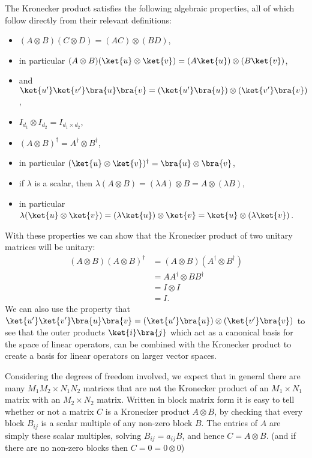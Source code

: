 The Kronecker product satisfies the following algebraic properties, all of which follow directly from their relevant definitions:
\begin{itemize}
	\item $(A\otimes B)(C \otimes D) = (AC) \otimes (BD)$,
	\item in particular $(A\otimes B)(\ket{u} \otimes \ket{v}) = (A\ket{u})\otimes (B\ket{v})$,
	\item and $\ket{u'}\ket{v'}\bra{u}\bra{v} = (\ket{u'}\bra{u})\otimes(\ket{v'}\bra{v})$,
	\item $I_{d_1} \otimes I_{d_2} = I_{d_1\times d_2}$,
	\item $(A\otimes B)^\dagger = A^\dagger \otimes B^\dagger$,
	\item in particular $(\ket{u}\otimes \ket{v})^\dagger = \bra{u} \otimes \bra{v}$,
	\item if $\lambda$ is a scalar, then $\lambda (A \otimes B) = (\lambda A) \otimes B = A \otimes (\lambda B)$,
	\item in particular $\lambda (\ket{u} \otimes \ket{v}) = (\lambda \ket{u}) \otimes \ket{v} = \ket{u} \otimes (\lambda \ket{v})$.
\end{itemize}
With these properties we can show that the Kronecker product of two unitary matrices will be unitary:
\begin{align*}
	(A \otimes B)(A \otimes B)^\dagger
	&= (A \otimes B)(A^\dagger \otimes B^\dagger)
	\\&= AA^\dagger \otimes BB^\dagger
	\\&= I \otimes I
	\\&= I.
\end{align*}
We can also use the property that $\ket{u'}\ket{v'}\bra{u}\bra{v} = (\ket{u'}\bra{u})\otimes(\ket{v'}\bra{v})$ to see that the outer products $\ket{i}\bra{j}$ which act as a canonical basis for the space of linear operators, can be combined with the Kronecker product to create a basis for linear operators on larger vector spaces.

Considering the degrees of freedom involved, we expect that in general there are many $M_1M_2 \times N_1N_2$ matrices that are not the Kronecker product of an $M_1 \times N_1$ matrix with an $M_2 \times N_2$ matrix. Written in block matrix form it is easy to tell whether or not a matrix $C$ is a Kronecker product $A \otimes B$, by checking that every block $B_{ij}$ is a scalar multiple of any non-zero block $B$. The entries of $A$ are simply these scalar multiples, solving $B_{ij} = a_{ij}B$, and hence $C = A \otimes B$. (and if there are no non-zero blocks then $C = 0 = 0 \otimes 0$)
